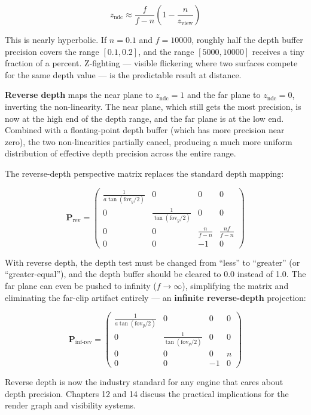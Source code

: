 \documentclass[
  11pt,
  letterpaper,
  DIV=11,
  numbers=noendperiod,
  twoside,
  open=right]{scrreprt}
\begin{document}
\[
z_{\text{ndc}} \approx \frac{f}{f - n} \left(1 - \frac{n}{z_{\text{view}}}\right)
\]

This is nearly hyperbolic. If \(n = 0.1\) and \(f = 10000\), roughly
half the depth buffer precision covers the range \([0.1, 0.2]\), and the
range \([5000, 10000]\) receives a tiny fraction of a percent.
Z-fighting --- visible flickering where two surfaces compete for the
same depth value --- is the predictable result at distance.

\textbf{Reverse depth} maps the near plane to \(z_{\text{ndc}} = 1\) and
the far plane to \(z_{\text{ndc}} = 0\), inverting the non-linearity.
The near plane, which still gets the most precision, is now at the high
end of the depth range, and the far plane is at the low end. Combined
with a floating-point depth buffer (which has more precision near zero),
the two non-linearities partially cancel, producing a much more uniform
distribution of effective depth precision across the entire range.

The reverse-depth perspective matrix replaces the standard depth
mapping:

\[
\mathbf{P}_{\text{rev}} = \begin{pmatrix}
  \frac{1}{a \tan(\text{fov}_y / 2)} & 0 & 0 & 0 \\
  0 & \frac{1}{\tan(\text{fov}_y / 2)} & 0 & 0 \\
  0 & 0 & \frac{n}{f - n} & \frac{n f}{f - n} \\
  0 & 0 & -1 & 0
\end{pmatrix}
\]

With reverse depth, the depth test must be changed from ``less'' to
``greater'' (or ``greater-equal''), and the depth buffer should be
cleared to 0.0 instead of 1.0. The far plane can even be pushed to
infinity (\(f \to \infty\)), simplifying the matrix and eliminating the
far-clip artifact entirely --- an \textbf{infinite reverse-depth}
projection:

\[
\mathbf{P}_{\text{inf-rev}} = \begin{pmatrix}
  \frac{1}{a \tan(\text{fov}_y / 2)} & 0 & 0 & 0 \\
  0 & \frac{1}{\tan(\text{fov}_y / 2)} & 0 & 0 \\
  0 & 0 & 0 & n \\
  0 & 0 & -1 & 0
\end{pmatrix}
\]

Reverse depth is now the industry standard for any engine that cares
about depth precision. Chapters 12 and 14 discuss the practical
implications for the render graph and visibility systems.
\end{document}
